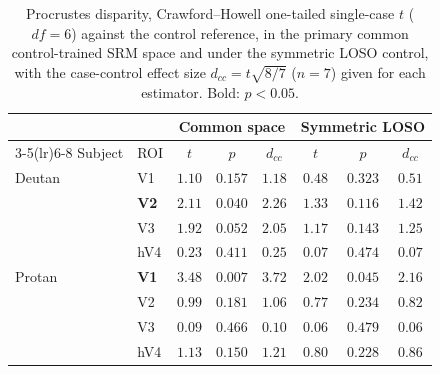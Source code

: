 \begin{table}[h]
\centering
\caption{Procrustes disparity, Crawford--Howell one-tailed single-case $t$ ($df = 6$) against the control reference, in the primary common control-trained SRM space and under the symmetric LOSO control, with the case-control effect size $d_{cc} = t\sqrt{8/7}$ ($n = 7$) given for each estimator. Bold: $p < 0.05$.}
\label{tab:disparity_loso}
\begin{tabular}{llcccccc}
\toprule
 & & \multicolumn{3}{c}{Common space} & \multicolumn{3}{c}{Symmetric LOSO} \\
\cmidrule(lr){3-5}\cmidrule(lr){6-8}
Subject & ROI & $t$ & $p$ & $d_{cc}$ & $t$ & $p$ & $d_{cc}$ \\
\midrule
Deutan & V1 & $1.10$ & $0.157$ & $1.18$ & $0.48$ & $0.323$ & $0.51$ \\
 & \textbf{V2} & $\mathbf{2.11}$ & $\mathbf{0.040}$ & $2.26$ & $1.33$ & $0.116$ & $1.42$ \\
 & V3 & $1.92$ & $0.052$ & $2.05$ & $1.17$ & $0.143$ & $1.25$ \\
 & hV4 & $0.23$ & $0.411$ & $0.25$ & $0.07$ & $0.474$ & $0.07$ \\
\midrule
Protan & \textbf{V1} & $\mathbf{3.48}$ & $\mathbf{0.007}$ & $3.72$ & $\mathbf{2.02}$ & $\mathbf{0.045}$ & $2.16$ \\
 & V2 & $0.99$ & $0.181$ & $1.06$ & $0.77$ & $0.234$ & $0.82$ \\
 & V3 & $0.09$ & $0.466$ & $0.10$ & $0.06$ & $0.479$ & $0.06$ \\
 & hV4 & $1.13$ & $0.150$ & $1.21$ & $0.80$ & $0.228$ & $0.86$ \\
\bottomrule
\end{tabular}
\end{table}



